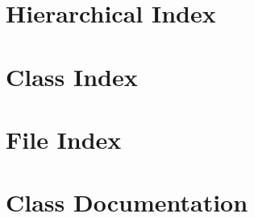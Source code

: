 \documentclass[twoside]{book}
\newcommand{\+}{\discretionary{\mbox{\scriptsize$\hookleftarrow$}}{}{}}
\begin{document}
\chapter{Hierarchical Index}

\chapter{Class Index}

\chapter{File Index}

\chapter{Class Documentation}





























































\end{document}
